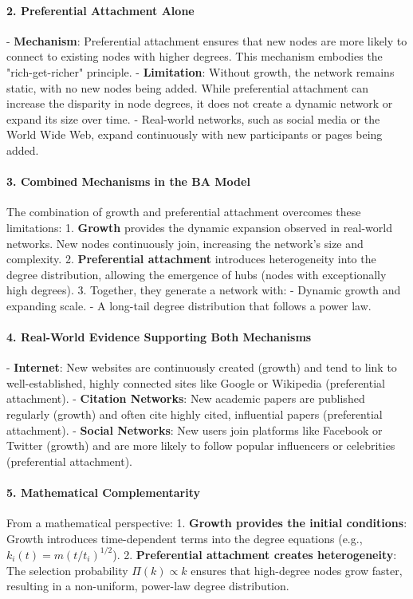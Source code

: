 \documentclass{article}
\begin{document}
\paragraph{2. Preferential Attachment Alone}
- \textbf{Mechanism}: Preferential attachment ensures that new nodes are more likely to connect to existing nodes with higher degrees. This mechanism embodies the "rich-get-richer" principle.
- \textbf{Limitation}: Without growth, the network remains static, with no new nodes being added. While preferential attachment can increase the disparity in node degrees, it does not create a dynamic network or expand its size over time.
  - Real-world networks, such as social media or the World Wide Web, expand continuously with new participants or pages being added.

\paragraph{3. Combined Mechanisms in the BA Model}
The combination of growth and preferential attachment overcomes these limitations:
1. \textbf{Growth} provides the dynamic expansion observed in real-world networks. New nodes continuously join, increasing the network's size and complexity.
2. \textbf{Preferential attachment} introduces heterogeneity into the degree distribution, allowing the emergence of hubs (nodes with exceptionally high degrees).
3. Together, they generate a network with:
   - Dynamic growth and expanding scale.
   - A long-tail degree distribution that follows a power law.

\paragraph{4. Real-World Evidence Supporting Both Mechanisms}
- \textbf{Internet}: New websites are continuously created (growth) and tend to link to well-established, highly connected sites like Google or Wikipedia (preferential attachment).
- \textbf{Citation Networks}: New academic papers are published regularly (growth) and often cite highly cited, influential papers (preferential attachment).
- \textbf{Social Networks}: New users join platforms like Facebook or Twitter (growth) and are more likely to follow popular influencers or celebrities (preferential attachment).

\paragraph{5. Mathematical Complementarity}
From a mathematical perspective:
1. \textbf{Growth provides the initial conditions}: Growth introduces time-dependent terms into the degree equations (e.g., \( k_i(t) = m(t/t_i)^{1/2} \)).
2. \textbf{Preferential attachment creates heterogeneity}: The selection probability \( \Pi(k) \propto k \) ensures that high-degree nodes grow faster, resulting in a non-uniform, power-law degree distribution.
\end{document}

